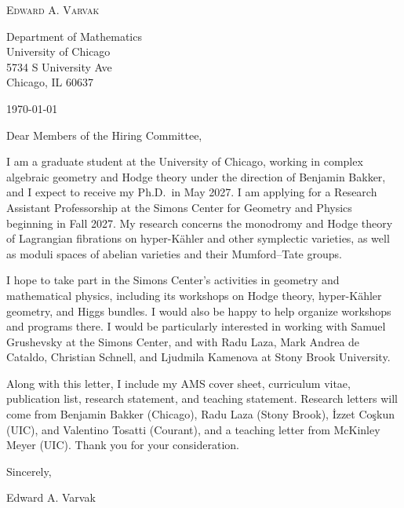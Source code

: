 \documentclass[12pt]{article}
\begin{document}
\begin{center}
  {\Large\textsc{Edward A. Varvak}}\\[10pt]
\end{center}

Department of Mathematics \\
University of Chicago \\
5734 S University Ave \\
Chicago, IL 60637

\today

Dear Members of the Hiring Committee,

I am a graduate student at the University of Chicago, working in complex
algebraic geometry and Hodge theory under the direction of Benjamin Bakker,
and I expect to receive my Ph.D.\ in May 2027. I am applying for a Research
Assistant Professorship at the Simons Center for Geometry and Physics
beginning in Fall 2027. My research concerns the monodromy and Hodge theory
of Lagrangian fibrations on hyper-K\"ahler and other symplectic varieties, as
well as moduli spaces of abelian varieties and their Mumford--Tate groups.

I hope to take part in the Simons Center's activities in geometry and
mathematical physics, including its workshops on Hodge theory,
hyper-K\"ahler geometry, and Higgs bundles. I would also be happy to help
organize workshops and programs there.
I would be particularly interested in working with Samuel Grushevsky 
at the Simons Center, and with Radu Laza, Mark Andrea de Cataldo, Christian Schnell, 
and Ljudmila Kamenova at Stony Brook University.

Along with this letter, I include my AMS cover sheet, curriculum vitae,
publication list, research statement, and teaching statement. Research
letters will come from Benjamin Bakker (Chicago), Radu Laza (Stony Brook),
\.{I}zzet Co\c{s}kun (UIC), and Valentino Tosatti (Courant), and a teaching
letter from McKinley Meyer (UIC). Thank you for your consideration.

Sincerely,

Edward A. Varvak
\end{document}
